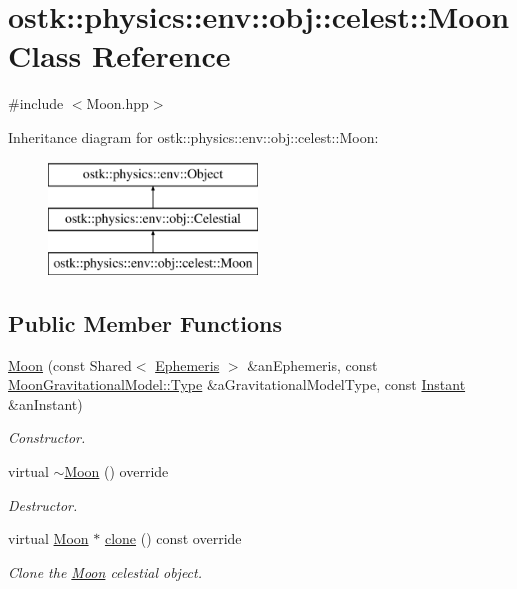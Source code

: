 \hypertarget{classostk_1_1physics_1_1env_1_1obj_1_1celest_1_1_moon}{}\section{ostk\+:\+:physics\+:\+:env\+:\+:obj\+:\+:celest\+:\+:Moon Class Reference}
\label{classostk_1_1physics_1_1env_1_1obj_1_1celest_1_1_moon}


{\ttfamily \#include $<$Moon.\+hpp$>$}

Inheritance diagram for ostk\+:\+:physics\+:\+:env\+:\+:obj\+:\+:celest\+:\+:Moon\+:\begin{figure}[H]
\begin{center}
\leavevmode
\includegraphics[height=3.000000cm]{classostk_1_1physics_1_1env_1_1obj_1_1celest_1_1_moon}
\end{center}
\end{figure}
\subsection*{Public Member Functions}
\begin{DoxyCompactItemize}
\item 
\hyperlink{classostk_1_1physics_1_1env_1_1obj_1_1celest_1_1_moon_a6e688846e85ca12019d6e27600f80753}{Moon} (const Shared$<$ \hyperlink{classostk_1_1physics_1_1env_1_1_ephemeris}{Ephemeris} $>$ \&an\+Ephemeris, const \hyperlink{classostk_1_1physics_1_1environment_1_1gravitational_1_1_moon_a09ec881799f85fdef3547ef443d57c27}{Moon\+Gravitational\+Model\+::\+Type} \&a\+Gravitational\+Model\+Type, const \hyperlink{classostk_1_1physics_1_1time_1_1_instant}{Instant} \&an\+Instant)
\begin{DoxyCompactList}\small\item\em Constructor. \end{DoxyCompactList}\item 
virtual \hyperlink{classostk_1_1physics_1_1env_1_1obj_1_1celest_1_1_moon_ad7c6677716956e7175798afa5f3bd9d4}{$\sim$\+Moon} () override
\begin{DoxyCompactList}\small\item\em Destructor. \end{DoxyCompactList}\item 
virtual \hyperlink{classostk_1_1physics_1_1env_1_1obj_1_1celest_1_1_moon}{Moon} $\ast$ \hyperlink{classostk_1_1physics_1_1env_1_1obj_1_1celest_1_1_moon_adcfeda7b73d32df67f5b38c05ca9351a}{clone} () const override
\begin{DoxyCompactList}\small\item\em Clone the \hyperlink{classostk_1_1physics_1_1env_1_1obj_1_1celest_1_1_moon}{Moon} celestial object. \end{DoxyCompactList}\end{DoxyCompactItemize}
